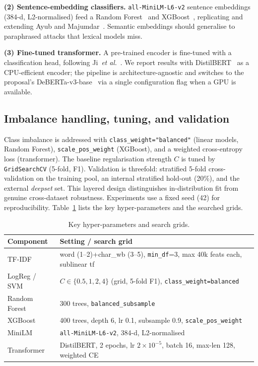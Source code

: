 \documentclass[conference]{IEEEtran}
\begin{document}
\textbf{(2) Sentence-embedding classifiers.} \texttt{all-MiniLM-L6-v2}
sentence embeddings~\cite{reimers2019sentencebert} (384-d, L2-normalised) feed a
Random Forest~\cite{breiman2001randomforest} and
XGBoost~\cite{chen2016xgboost}, replicating and extending
Ayub and Majumdar~\cite{ayub2024embedding}. Semantic embeddings should
generalise to paraphrased attacks that lexical models miss.

\textbf{(3) Fine-tuned transformer.} A pre-trained encoder is fine-tuned with a
classification head, following Ji~\emph{et al.}~\cite{ji2025detection}. We report
results with DistilBERT~\cite{sanh2019distilbert} as a CPU-efficient encoder; the
pipeline is architecture-agnostic and switches to the proposal's
DeBERTa-v3-base~\cite{he2021debertav3} via a single configuration flag when a GPU
is available.

\subsection{Imbalance handling, tuning, and validation}
Class imbalance is addressed with \texttt{class\_weight="balanced"} (linear
models, Random Forest), \texttt{scale\_pos\_weight} (XGBoost), and a weighted
cross-entropy loss (transformer). The baseline regularisation strength $C$ is
tuned by \texttt{GridSearchCV} (5-fold, F1). Validation is threefold: stratified
5-fold cross-validation on the training pool, an internal stratified hold-out
(20\%), and the external \emph{deepset} set. This layered design distinguishes
in-distribution fit from genuine cross-dataset robustness. Experiments use a
fixed seed (42) for reproducibility. Table~\ref{tab:hyper} lists the key
hyper-parameters and the searched grids.

\begin{table}[t]
\caption{Key hyper-parameters and search grids.}
\label{tab:hyper}
\centering
\small
\begin{tabular}{@{}lp{5.4cm}@{}}
\toprule
Component & Setting / search grid \\
\midrule
TF-IDF & word (1--2)+char\_wb (3--5), \texttt{min\_df}=3, max 40k feats each, sublinear tf \\
LogReg / SVM & $C\in\{0.5,1,2,4\}$ (grid, 5-fold F1), \texttt{class\_weight=balanced} \\
Random Forest & 300 trees, \texttt{balanced\_subsample} \\
XGBoost & 400 trees, depth 6, lr 0.1, subsample 0.9, \texttt{scale\_pos\_weight} \\
MiniLM & \texttt{all-MiniLM-L6-v2}, 384-d, L2-normalised \\
Transformer & DistilBERT, 2 epochs, lr $2\!\times\!10^{-5}$, batch 16, max-len 128, weighted CE \\
\bottomrule
\end{tabular}
\end{table}
\end{document}
